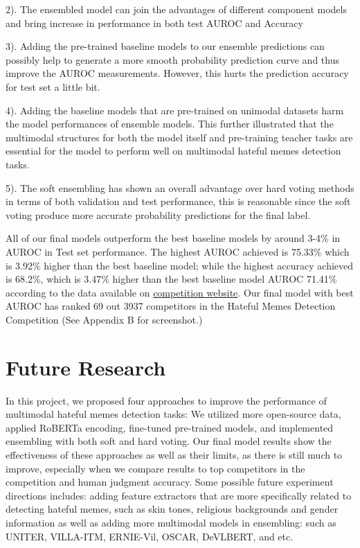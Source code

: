 \documentclass[10pt,twocolumn,letterpaper]{article}
\begin{document}
2). The ensembled model can join the advantages of different component models and bring increase in performance in both test AUROC and Accuracy

3). Adding the pre-trained baseline models to our ensemble predictions can possibly help to generate a more smooth probability prediction curve and thus improve the AUROC measurements. However, this hurts the prediction accuracy for test set a little bit.

4). Adding the baseline models that are pre-trained on unimodal datasets harm the model performances of ensemble models. This further illustrated that the multimodal structures for both the model itself and pre-training teacher tasks are essential for the model to perform well on multimodal hateful memes detection tasks. 

5). The soft ensembling has shown an overall advantage over hard voting methods in terms of both validation and test performance, this is reasonable since the soft voting produce more accurate probability predictions for the final label.

All of our final models outperform the best baseline models by around 3-4\% in AUROC in Test set performance. The highest AUROC achieved is 75.33\% which is 3.92\% higher than the best baseline model; while the highest accuracy achieved is 68.2\%, which is 3.47\% higher than the best baseline model AUROC 71.41\% according to the data available on \href{https://www.drivendata.org/competitions/64/hateful-memes/leaderboard/}{competition website}. Our final model with best AUROC has ranked 69 out 3937 competitors in the Hateful Memes Detection Competition (See Appendix B for screenshot.)


\section{Future Research}
In this project, we proposed four approaches to improve the performance of multimodal hateful memes detection tasks: We utilized more open-source data, applied RoBERTa encoding, fine-tuned pre-trained models, and implemented ensembling with both soft and hard voting. Our final model results show the effectiveness of these approaches as well as their limits, as there is still much  to improve, especially when we compare results to top competitors in the competition and human judgment accuracy. Some possible future experiment directions includes: adding feature extractors that are more specifically related to detecting hateful memes, such as skin tones, religious backgrounds and gender information as well as adding more multimodal models in ensembling: such as UNITER, VILLA-ITM, ERNIE-Vil, OSCAR, DeVLBERT, and etc.
\end{document}
